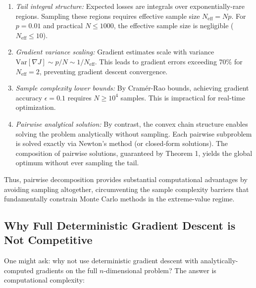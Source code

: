 \documentclass[12pt]{article}
\theoremstyle{definition}
\begin{document}
\begin{enumerate}
    \item \emph{Tail integral structure:} Expected losses are integrals over exponentially-rare regions. Sampling these regions requires effective sample size $N_{\text{eff}} = Np$. For $p=0.01$ and practical $N \leq 1000$, the effective sample size is negligible ($N_{\text{eff}} \leq 10$).

    \item \emph{Gradient variance scaling:} Gradient estimates scale with variance $\text{Var}[\nabla J] \sim p/N \sim 1/N_{\text{eff}}$. This leads to gradient errors exceeding 70\% for $N_{\text{eff}} = 2$, preventing gradient descent convergence.

    \item \emph{Sample complexity lower bounds:} By Cramér-Rao bounds, achieving gradient accuracy $\epsilon = 0.1$ requires $N \geq 10^4$ samples. This is impractical for real-time optimization.

    \item \emph{Pairwise analytical solution:} By contrast, the convex chain structure enables solving the problem analytically without sampling. Each pairwise subproblem is solved exactly via Newton's method (or closed-form solutions). The composition of pairwise solutions, guaranteed by Theorem 1, yields the global optimum without ever sampling the tail.
\end{enumerate}

Thus, pairwise decomposition provides substantial computational advantages by avoiding sampling altogether, circumventing the sample complexity barriers that fundamentally constrain Monte Carlo methods in the extreme-value regime.

\subsection*{Why Full Deterministic Gradient Descent is Not Competitive}

One might ask: why not use deterministic gradient descent with analytically-computed gradients on the full $n$-dimensional problem? The answer is computational complexity:
\end{document}
